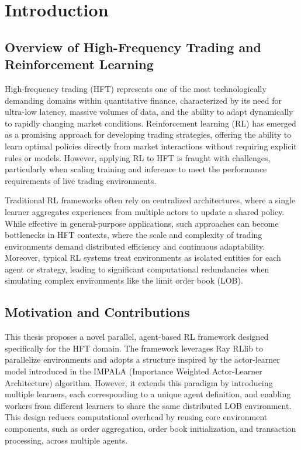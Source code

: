 \section{Introduction}
\subsection{Overview of High-Frequency Trading and Reinforcement Learning}
High-frequency trading (HFT) represents one of the most technologically demanding domains within quantitative finance,
characterized by its need for ultra-low latency, massive volumes of data, and the ability to adapt dynamically to rapidly changing market conditions. 
Reinforcement learning (RL) has emerged as a promising approach for developing trading strategies, 
offering the ability to learn optimal policies directly from market interactions without requiring explicit rules or models.
However, applying RL to HFT is fraught with challenges, particularly when scaling training and inference to meet the performance 
requirements of live trading environments.

Traditional RL frameworks often rely on centralized architectures, where a single learner aggregates experiences from multiple actors to update a shared policy. 
While effective in general-purpose applications, such approaches can become bottlenecks in HFT contexts, 
where the scale and complexity of trading environments demand distributed efficiency and continuous adaptability. 
Moreover, typical RL systems treat environments as isolated entities for each agent or strategy, 
leading to significant computational redundancies when simulating complex environments like the limit order book (LOB).

\subsection{Motivation and Contributions}

This thesis proposes a novel parallel, agent-based RL framework designed specifically for the HFT domain. 
The framework leverages Ray RLlib to parallelize environments and adopts a structure inspired by the actor-learner model introduced in the 
IMPALA (Importance Weighted Actor-Learner Architecture) algorithm. 
However, it extends this paradigm by introducing multiple learners, each corresponding to a unique agent definition, 
and enabling workers from different learners to share the same distributed LOB environment. 
This design reduces computational overhead by reusing core environment components, such as order aggregation, order book initialization,
and transaction processing, across multiple agents.

